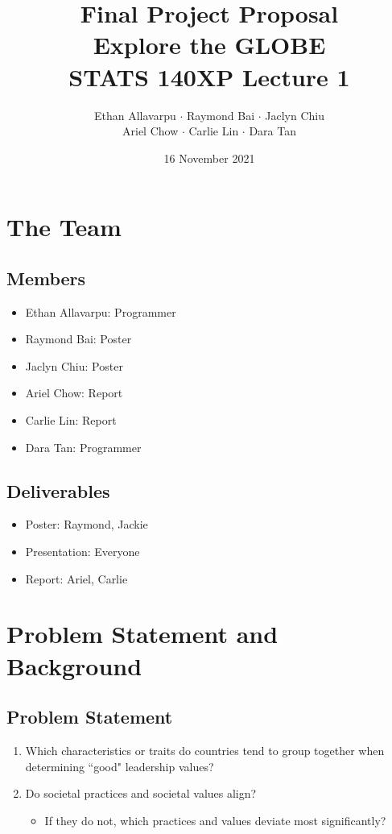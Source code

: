 \documentclass{article}
\title{%
  Final Project Proposal \\
  \large Explore the GLOBE \\
  STATS 140XP Lecture 1}
\author{Ethan Allavarpu $\cdot$ Raymond Bai $\cdot$ Jaclyn Chiu \\ Ariel Chow $\cdot$ Carlie Lin $\cdot$ Dara Tan}
\date{16 November 2021}
\begin{document}
\maketitle

\section{The Team}
\subsection{Members}
\begin{itemize}
    \item Ethan Allavarpu: Programmer
    \item Raymond Bai: Poster
    \item Jaclyn Chiu: Poster
    \item Ariel Chow: Report
    \item Carlie Lin: Report
    \item Dara Tan: Programmer
\end{itemize}

\subsection{Deliverables}
\begin{itemize}
    \item Poster: Raymond, Jackie
    \item Presentation: Everyone
    \item Report: Ariel, Carlie
\end{itemize}

\section{Problem Statement and Background}

\subsection{Problem Statement}

\begin{enumerate}
    \item Which characteristics or traits do countries tend to group together when determining ``good" leadership values?
    \item Do societal practices and societal values align?
    \begin{itemize}
        \item If they do not, which practices and values deviate most significantly?
    \end{itemize}
\end{enumerate}
\end{document}

